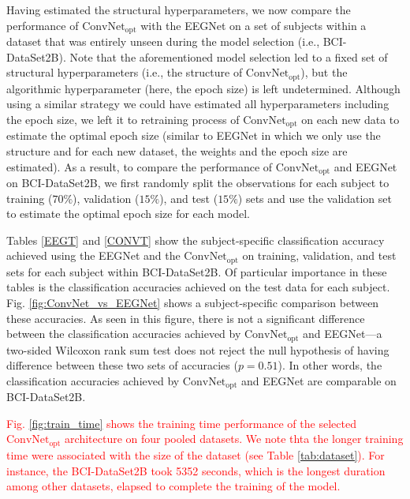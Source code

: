 \documentclass{ieeeaccess}
\begin{document}
{    Having estimated the structural hyperparameters, we now compare the performance of $\text{ConvNet}_{\text{opt}}$ with the EEGNet on a set of subjects within a dataset that was entirely unseen during the model selection (i.e., BCI-DataSet2B). Note that the aforementioned model selection led to a fixed set of structural hyperparameters (i.e., the structure of $\text{ConvNet}_{\text{opt}}$), but the algorithmic hyperparameter (here, the epoch size) is left undetermined. Although using a similar strategy we could have estimated all hyperparameters including the epoch size, we left it to retraining process of $\text{ConvNet}_{\text{opt}}$ on each new data to estimate the optimal epoch size (similar to EEGNet in which we only use the structure and for each new dataset, the weights and the epoch size are estimated). As a result, to compare the performance of $\text{ConvNet}_{\text{opt}}$ and EEGNet on BCI-DataSet2B, we first randomly split the observations for each subject to training ($70\%$), validation ($15\%$), and test ($15\%$) sets  and use the validation set to estimate the optimal epoch size for each model. 
    
    Tables \ref{EEGT} and \ref{CONVT} show the subject-specific classification accuracy achieved using the EEGNet and the $\text{ConvNet}_{\text{opt}}$ on training, validation, and test sets for each subject within BCI-DataSet2B. Of particular importance in these tables is the classification accuracies achieved on the test data for each subject. Fig. \ref{fig:ConvNet_vs_EEGNet} shows a subject-specific comparison between these accuracies. As seen in this figure, there is not a significant difference between the classification accuracies achieved by $\text{ConvNet}_{\text{opt}}$ and EEGNet---a two-sided Wilcoxon rank sum test does not reject the null hypothesis of having difference between these two sets of accuracies ($p=0.51$). In other words, the classification accuracies achieved by $\text{ConvNet}_{\text{opt}}$ and EEGNet are comparable on BCI-DataSet2B. 
 
    \textcolor{red}{Fig. \ref{fig:train_time} shows the training time performance of the selected  $\text{ConvNet}_{\text{opt}}$ architecture on four pooled datasets. We note thta the longer training time were associated with the size of the dataset (see Table \ref{tab:dataset}). For instance, the BCI-DataSet2B took 5352 seconds, which is the longest duration among other datasets, elapsed to complete the training of the model.}
     
}
\end{document}
